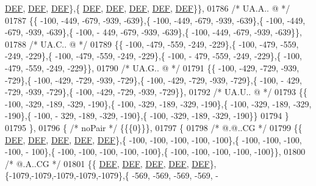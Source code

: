 \begin{DoxyCode}
      \mbox{\hyperlink{1_88_84__epars_8h_a397419fc12b37ed479c8abb9d444d843}{DEF}},  \mbox{\hyperlink{1_88_84__epars_8h_a397419fc12b37ed479c8abb9d444d843}{DEF}},  \mbox{\hyperlink{1_88_84__epars_8h_a397419fc12b37ed479c8abb9d444d843}{DEF}}\},\{  \mbox{\hyperlink{1_88_84__epars_8h_a397419fc12b37ed479c8abb9d444d843}{DEF}},  \mbox{\hyperlink{1_88_84__epars_8h_a397419fc12b37ed479c8abb9d444d843}{DEF}},  \mbox{\hyperlink{1_88_84__epars_8h_a397419fc12b37ed479c8abb9d444d843}{DEF}},  \mbox{\hyperlink{1_88_84__epars_8h_a397419fc12b37ed479c8abb9d444d843}{DEF}},  \mbox{\hyperlink{1_88_84__epars_8h_a397419fc12b37ed479c8abb9d444d843}{DEF}}\}\},
01786 \textcolor{comment}{/* UA.A.. @ */}
01787 \{\{ -100, -449, -679, -939, -639\},\{ -100, -449, -679, -939, -639\},\{ -100, -449, -679, -939, -639\},\{ -100, -
      449, -679, -939, -639\},\{ -100, -449, -679, -939, -639\}\},
01788 \textcolor{comment}{/* UA.C.. @ */}
01789 \{\{ -100, -479, -559, -249, -229\},\{ -100, -479, -559, -249, -229\},\{ -100, -479, -559, -249, -229\},\{ -100, -
      479, -559, -249, -229\},\{ -100, -479, -559, -249, -229\}\},
01790 \textcolor{comment}{/* UA.G.. @ */}
01791 \{\{ -100, -429, -729, -939, -729\},\{ -100, -429, -729, -939, -729\},\{ -100, -429, -729, -939, -729\},\{ -100, -
      429, -729, -939, -729\},\{ -100, -429, -729, -939, -729\}\},
01792 \textcolor{comment}{/* UA.U.. @ */}
01793 \{\{ -100, -329, -189, -329, -190\},\{ -100, -329, -189, -329, -190\},\{ -100, -329, -189, -329, -190\},\{ -100, -
      329, -189, -329, -190\},\{ -100, -329, -189, -329, -190\}\}
01794 \}
01795 \},
01796 \{ \textcolor{comment}{/* noPair */} \{\{\{0\}\}\},
01797 \{
01798 \textcolor{comment}{/*  @.@..CG */}
01799 \{\{  \mbox{\hyperlink{1_88_84__epars_8h_a397419fc12b37ed479c8abb9d444d843}{DEF}},  \mbox{\hyperlink{1_88_84__epars_8h_a397419fc12b37ed479c8abb9d444d843}{DEF}},  \mbox{\hyperlink{1_88_84__epars_8h_a397419fc12b37ed479c8abb9d444d843}{DEF}},  \mbox{\hyperlink{1_88_84__epars_8h_a397419fc12b37ed479c8abb9d444d843}{DEF}},  \mbox{\hyperlink{1_88_84__epars_8h_a397419fc12b37ed479c8abb9d444d843}{DEF}}\},\{ -100, -100, -100, -100, -100\},\{ -100, -100, -100, -100, -
      100\},\{ -100, -100, -100, -100, -100\},\{ -100, -100, -100, -100, -100\}\},
01800 \textcolor{comment}{/*  @.A..CG */}
01801 \{\{  \mbox{\hyperlink{1_88_84__epars_8h_a397419fc12b37ed479c8abb9d444d843}{DEF}},  \mbox{\hyperlink{1_88_84__epars_8h_a397419fc12b37ed479c8abb9d444d843}{DEF}},  \mbox{\hyperlink{1_88_84__epars_8h_a397419fc12b37ed479c8abb9d444d843}{DEF}},  \mbox{\hyperlink{1_88_84__epars_8h_a397419fc12b37ed479c8abb9d444d843}{DEF}},  \mbox{\hyperlink{1_88_84__epars_8h_a397419fc12b37ed479c8abb9d444d843}{DEF}}\},\{-1079,-1079,-1079,-1079,-1079\},\{ -569, -569, -569, -569, -

\end{DoxyCode}
